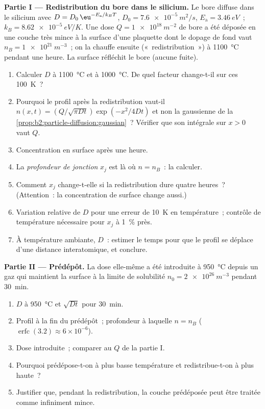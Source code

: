 \begin{problem}\label{pb:b2:particle-diffusion:1}
\textbf{Partie I --- Redistribution du bore dans le silicium.}
Le bore diffuse dans le silicium avec $D = D_0\,\eu^{-E_{\text{a}}/k_BT}$, $D_0 =
\qty{7.6e-5}{m^2/s}$, $E_{\text{a}} = \qty{3.46}{eV}$~; $k_B =
\qty{8.62e-5}{eV/K}$. Une dose $Q = \qty{1e18}{m^{-2}}$ de bore a été
déposée en une couche très mince à la surface d'une plaquette dont le
dopage de fond vaut $n_B = \qty{1e21}{m^{-3}}$~; on la chauffe ensuite
(«~redistribution~») à \qty{1100}{\celsius} pendant une heure. La surface
réfléchit le bore (aucune fuite).
\begin{enumerate}
  \item Calculer $D$ à \qty{1100}{\celsius} et à \qty{1000}{\celsius}.
        De quel facteur change-t-il sur ces \qty{100}{K}~?
  \item Pourquoi le profil après la redistribution vaut-il $n(x,t) = (Q/\sqrt{\pi
        Dt})\exp(-x^2/4Dt)$ et non la gaussienne de la
        \cref{prop:b2:particle-diffusion:gaussian}~? Vérifier que son
        intégrale sur $x > 0$ vaut $Q$.
  \item Concentration en surface après une heure.
  \item La \emph{profondeur de jonction} $x_j$ est là où $n = n_B$~: la calculer.
  \item Comment $x_j$ change-t-elle si la redistribution dure quatre heures~?
        (Attention~: la concentration de surface change aussi.)
  \item Variation relative de $D$ pour une erreur de \qty{10}{K} en température~;
        contrôle de température nécessaire pour $x_j$ à \qty{1}{\%} près.
  \item À température ambiante, $D$~: estimer le temps pour que le profil se
        déplace d'une distance interatomique, et conclure.
\end{enumerate}

\textbf{Partie II --- Prédépôt.}
La dose elle-même a été introduite à \qty{950}{\celsius} depuis un gaz qui maintient
la surface à la limite de solubilité $n_0 = \qty{2e26}{m^{-3}}$ pendant
\qty{30}{min}.
\begin{enumerate}[resume]
  \item $D$ à \qty{950}{\celsius} et $\sqrt{Dt}$ pour \qty{30}{min}.
  \item Profil à la fin du prédépôt~; profondeur à laquelle $n =
        n_B$ ($\operatorname{erfc}(3.2) \approx 6 \times 10^{-6}$).
  \item Dose introduite~; comparer au $Q$ de la partie I.
  \item Pourquoi prédépose-t-on à plus basse température et redistribue-t-on à
        plus haute~?
  \item Justifier que, pendant la redistribution, la couche prédéposée peut être
        traitée comme infiniment mince.
\end{enumerate}


\end{problem}
